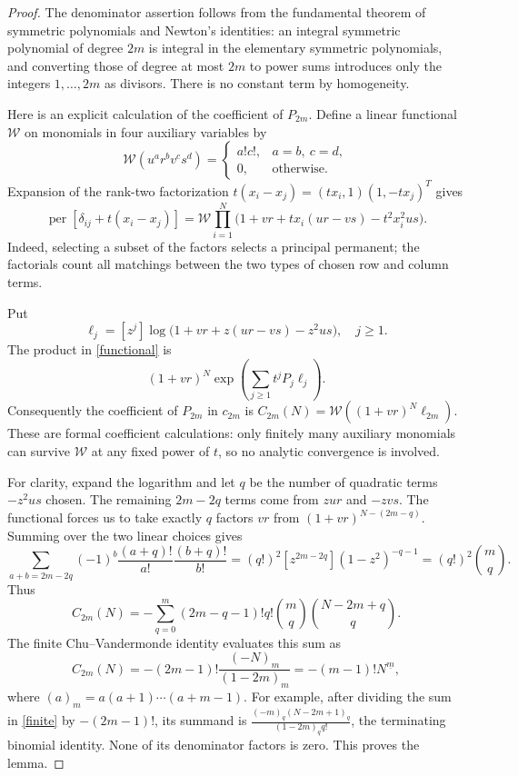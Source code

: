 \documentclass[10pt]{article}
\newcommand{\per}{\operatorname{per}}
\newcommand{\fall}[2]{#1^{\underline{#2}}}
\begin{document}
\begin{proof}
The denominator assertion follows from the fundamental theorem of
symmetric polynomials and Newton's identities: an integral symmetric
polynomial of degree \(2m\) is integral in the elementary symmetric
polynomials, and converting those of degree at most \(2m\) to power
sums introduces only the integers \(1,\ldots,2m\) as divisors.
There is no constant term by homogeneity.

Here is an explicit calculation of the coefficient of \(P_{2m}\).
Define a linear functional \(\mathcal W\) on monomials in four
auxiliary variables by
\[
 \mathcal W(u^a r^b v^c s^d)=
 \begin{cases}a!c!,&a=b,\ c=d,\\0,&\text{otherwise}.\end{cases}
\]
Expansion of the rank-two factorization \(t(x_i-x_j)
=(tx_i,1)(1,-tx_j)^T\) gives
\begin{equation}\label{functional}
 \per[\delta_{ij}+t(x_i-x_j)]
 =\mathcal W\prod_{i=1}^N
 \bigl(1+vr+tx_i(ur-vs)-t^2x_i^2us\bigr).
\end{equation}
Indeed, selecting a subset of the factors selects a principal
permanent; the factorials count all matchings between the two
types of chosen row and column terms.

Put
\[
 \ell_j=[z^j]\log\bigl(1+vr+z(ur-vs)-z^2us\bigr),\quad j\ge1.
\]
The product in \eqref{functional} is
\[
 (1+vr)^N\exp\left(\sum_{j\ge1}t^jP_j\ell_j\right).
\]
Consequently the coefficient of \(P_{2m}\) in \(c_{2m}\) is
\(C_{2m}(N)=\mathcal W((1+vr)^N\ell_{2m})\).
These are formal coefficient calculations: only finitely many
auxiliary monomials can survive \(\mathcal W\) at any fixed power
of \(t\), so no analytic convergence is involved.

For clarity, expand the logarithm and let \(q\) be the number of
quadratic terms \(-z^2us\) chosen. The remaining \(2m-2q\) terms
come from \(zur\) and \(-zvs\). The functional forces us to take
exactly \(q\) factors \(vr\) from
\((1+vr)^{N-(2m-q)}\). Summing over the two linear choices gives
\[
 \sum_{a+b=2m-2q}(-1)^b
       \frac{(a+q)!}{a!}\frac{(b+q)!}{b!}
 =(q!)^2[z^{2m-2q}](1-z^2)^{-q-1}
 =(q!)^2\binom mq.
\]
Thus
\begin{equation}\label{finite}
 C_{2m}(N)=-\sum_{q=0}^m
 (2m-q-1)!q!\binom mq\binom{N-2m+q}{q}.
\end{equation}
The finite Chu--Vandermonde identity evaluates this sum as
\[
 C_{2m}(N)=-(2m-1)!
 \frac{(-N)_m}{(1-2m)_m}
 =-(m-1)!\fall{N}{m},
\]
where \((a)_m=a(a+1)\cdots(a+m-1)\).
For example, after dividing the sum in \eqref{finite} by
\(-(2m-1)!\), its summand is
\(\frac{(-m)_q(N-2m+1)_q}{(1-2m)_q q!}\), the terminating
binomial identity. None of its denominator factors is zero.
This proves the lemma.
\end{proof}
\end{document}
